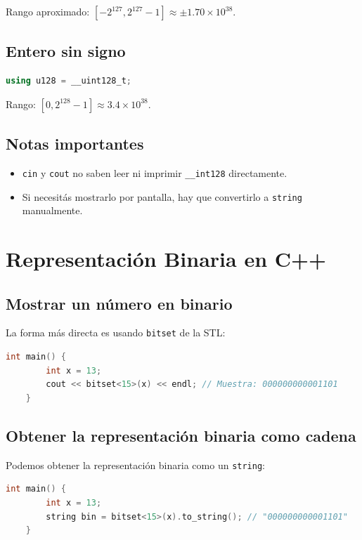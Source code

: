 Rango aproximado: \([ -2^{127}, 2^{127} - 1 ] \approx \pm 1.70 \times 10^{38}\).

\subsection{Entero sin signo}
\begin{lstlisting}[language=C++, caption={Entero de 128 bits sin signo}]
using u128 = __uint128_t;
\end{lstlisting}

Rango: \([0, 2^{128} - 1] \approx 3.4 \times 10^{38}\).

\subsection{Notas importantes}
\begin{itemize}
\item \texttt{cin} y \texttt{cout} no saben leer ni imprimir \texttt{\_\_int128} directamente.
\item Si necesitás mostrarlo por pantalla, hay que convertirlo a \texttt{string} manualmente.
\end{itemize}

\section{Representación Binaria en C++}
\subsection{Mostrar un número en binario}

La forma más directa es usando \texttt{bitset} de la STL:

\begin{lstlisting}[language=C++, caption=Muestra un número en binario con 15 bits]
	int main() {
		int x = 13;
		cout << bitset<15>(x) << endl; // Muestra: 000000000001101
	}
\end{lstlisting}

\subsection{Obtener la representación binaria como cadena}

Podemos obtener la representación binaria como un \texttt{string}:

\begin{lstlisting}[language=C++, caption=Convertir un número a cadena binaria]
	int main() {
		int x = 13;
		string bin = bitset<15>(x).to_string(); // "000000000001101"
	}
\end{lstlisting}


